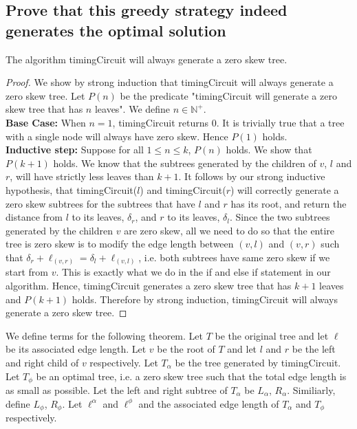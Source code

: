 \documentclass[11pt]{scrartcl}
\begin{document}
\subsection{
	Prove that this greedy strategy indeed generates the optimal solution
}
\begin{lemma}
	The algorithm timingCircuit will always generate a zero skew tree. 	
\end{lemma}
\begin{proof}
	We show by strong induction that timingCircuit will always generate a zero skew tree. 	
	Let $P(n)$ be the predicate "timingCircuit will generate a zero skew tree that has $n$ leaves".
	We define $n \in \mathbb{N}^+$. \\
	\textbf{Base Case:} When $n = 1$, timingCircuit returns $0$. It is trivially true 
	that a tree with a single node will always have zero skew. Hence $P(1)$ holds.\\
	\textbf{Inductive step:} Suppose for all $1 \leq n \leq k$, $P(n)$ holds. We show that $P(k+1)$ holds.
	We know that the subtrees generated by the children of $v$, $l$ and $r$, will have strictly less  
	leaves than $k+1$. It follows by our strong inductive hypothesis, that timingCircuit($l$) and timingCircuit($r$)
	will correctly generate a zero skew subtrees for the subtrees that have $l$ and $r$ has its root,
	and return the distance from $l$ to its leaves, $\delta_r$, and $r$ to its leaves, $\delta_l$.  
	Since the two subtrees generated by the children $v$ are zero skew, all we need to do so that 
	the entire tree is zero skew is to 
	modify the edge length between $(v,l)$ and $(v,r)$ such that  
	$\delta_r + \ell_{(v,r)} = \delta_l + \ell_{(v,l)}$, i.e. both subtrees have same zero skew 
	if we start from $v$. This is exactly what we do in the if and else if statement in our algorithm.
	Hence, timingCircuit generates a zero skew tree that has $k+1$ leaves and $P(k+1)$ holds. 
	Therefore by strong induction, timingCircuit will always generate a zero skew tree.
\end{proof} 

We define terms for the following theorem.
Let $T$ be the original tree and let $\ell$ be its associated edge length. 
Let $v$ be the root of $T$ and let $l$ and $r$ be the left and right child of $v$ respectively. 
Let $T_\alpha$ be the tree generated by timingCircuit. Let $T_\phi$ be an 
optimal tree, i.e. a zero skew tree such that the total edge length is as small as possible.
Let the left and right subtree of $T_\alpha$ be $L_\alpha$, $R_\alpha$.
Similiarly, define $L_\phi$, $R_\phi$. 
Let $\ell^\alpha$ and $\ell^\phi$ and the associated edge length of $T_\alpha$ and $T_\phi$ respectively.
\end{document}
